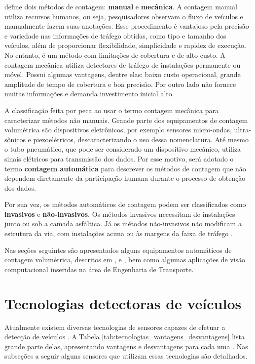\cite{goldner:2009:misc} define dois métodos de contagem: \textbf{manual} e \textbf{mecânica}. A contagem manual utiliza recursos humanos, ou seja, pesquisadores observam o fluxo de veículos e manualmente fazem suas anotações. Esse procedimento é vantajoso pela precisão e variedade nas informações de tráfego obtidas, como tipo e tamanho dos veículos, além de proporcionar flexibilidade, simplicidade e rapidez de execução. No entanto, é um método com limitações de cobertura e de alto custo. A contagem mecânica utiliza detectores de tráfego de instalações permanente ou móvel. Possui algumas vantagens, dentre elas: baixo custo operacional, grande amplitude de tempo de cobertura e boa precisão. Por outro lado não fornece muitas informações e demanda investimento inicial alto.

A classificação feita por \cite{goldner:2009:misc} peca ao usar o termo contagem mecânica para caracterizar métodos não manuais. Grande parte dos equipamentos de contagem volumétrica são dispositivos eletrônicos, por exemplo sensores micro-ondas, ultra-sônicos e piezoelétricos, descaracterizando o uso dessa nomenclatura. Até mesmo o tubo pneumático, que pode ser considerado um dispositivo mecânico, utiliza sinais elétricos para transmissão dos dados. Por esse motivo, será adotado o termo \textbf{contagem automática} para descrever os métodos de contagem que não dependem diretamente da participação humana durante o processo de obtenção dos dados.

Por sua vez, os métodos automáticos de contagem podem ser classificados como \textbf{invasivos} e \textbf{não-invasivos}. Os métodos invasivos necessitam de instalações junto ou sob a camada asfáltica. Já os métodos não-invasivos não modificam a estrutura da via, com instalações acima ou às margens da faixa de tráfego \citep{goldner:2009:misc}.

Nas seções seguintes são apresentados alguns equipamentos automáticos de contagem volumétrica, descritos em \cite{goldner:2009:misc}, \cite{almeida:2010:masther} e \cite{dnit:2011:online}, bem como algumas aplicações de visão computacional inseridas na área de Engenharia de Transporte.

\section{Tecnologias detectoras de veículos} %
\label{sec:tecnologias_detectoras_de_ve_culos}

Atualmente existem diversas tecnologias de sensores capazes de efetuar a detecção de veículos \citep{minnesota1997field}. A Tabela \ref{tab:tecnologias_vantagens_desvantagens} lista grande parte delas, apresentando vantagens e desvantagens para cada uma \citep{aguiar2008thesis}. Nas subseções a seguir alguns sensores que utilizam essas tecnologias são detalhados.

